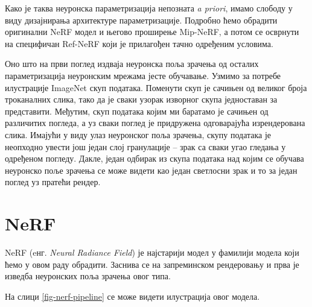 \documentclass[12pt, a4paper, twoside]{book}
\numberwithin{equation}{chapter}
\numberwithin{theorem}{section}
\numberwithin{definition}{section}
\numberwithin{definitionChapter}{chapter}
\begin{document}
	Како је таква неуронска параметризација непозната \textit{a priori}, имамо слободу у виду дизајнирања архитектуре
	параметризације. Подробно ћемо обрадити оригинални NeRF модел и његово проширење Mip-NeRF, а
	потом се осврнути на специфичан Ref-NeRF који је прилагођен тачно одређеним условима.
	
	Оно што на први поглед издваја неуронска поља зрачења од осталих параметризација неуронским мрежама јесте
	обучавање. Узмимо за потребе илустрације ImageNet \cite{imagenet} скуп података. Поменути скуп је сачињен
	од великог броја троканалних слика, тако да је сваки узорак изворног скупа једноставан за представити.
	Међутим, скуп података којим ми баратамо је сачињен од различитих погледа, а уз сваки поглед је придружена
	одговарајућа изрендерована слика. Имајући у виду улаз неуронског поља зрачења, скупу података је неопходно
	увести још један слој гранулације -- зрак са сваки угао гледања у одређеном погледу. Дакле, један одбирак
	из скупа података над којим се обучава неуронско поље зрачења се може видети као један светлосни зрак и то за
	један поглед уз пратећи рендер.

\section{NeRF}
NeRF (eнг. \textit{Neural Radiance Field}) је најстарији модел у фамилији модела који ћемо у овом раду обрадити.
Заснива се на запреминском рендеровању и прва је изведба неуронских поља зрачења овог типа.

На слици \ref{fig-nerf-pipeline} се може видети илустрација овог модела.
\end{document}

